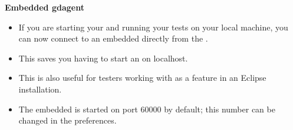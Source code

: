 
\textbf{Embedded gdagent{}}\\
\begin{itemize}
\item If you are starting your \gdaut{} and running your tests on your local machine, 
you can now connect to an embedded \gdagent{} directly from the \ite. 
\item This saves you having to start an \gdagent{} on localhost. 
\item This is also useful for testers working with \jb{} as a feature in an Eclipse installation. 
\item The embedded \gdagent{} is started on port 60000 by default; this number can be changed in the preferences.
\end{itemize}